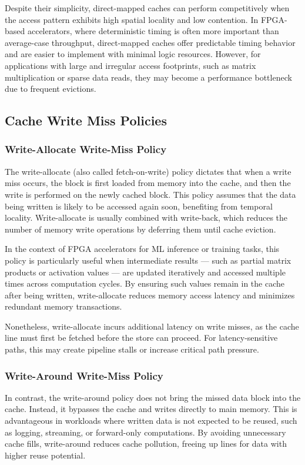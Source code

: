 Despite their simplicity, direct-mapped caches can perform competitively when the access pattern exhibits high spatial locality and low contention. In FPGA-based accelerators, where deterministic timing is often more important than average-case throughput, direct-mapped caches offer predictable timing behavior and are easier to implement with minimal logic resources. However, for applications with large and irregular access footprints, such as matrix multiplication or sparse data reads, they may become a performance bottleneck due to frequent evictions.

\subsection{Cache Write Miss Policies}
\subsubsection{Write-Allocate Write-Miss Policy}
The write-allocate (also called fetch-on-write) policy dictates that when a write miss occurs, the block is first loaded from memory into the cache, and then the write is performed on the newly cached block. This policy assumes that the data being written is likely to be accessed again soon, benefiting from temporal locality. Write-allocate is usually combined with write-back, which reduces the number of memory write operations by deferring them until cache eviction.

In the context of FPGA accelerators for ML inference or training tasks, this policy is particularly useful when intermediate results — such as partial matrix products or activation values — are updated iteratively and accessed multiple times across computation cycles. By ensuring such values remain in the cache after being written, write-allocate reduces memory access latency and minimizes redundant memory transactions\cite{cache-3}.

Nonetheless, write-allocate incurs additional latency on write misses, as the cache line must first be fetched before the store can proceed. For latency-sensitive paths, this may create pipeline stalls or increase critical path pressure.

\subsubsection{Write-Around Write-Miss Policy}
In contrast, the write-around policy does not bring the missed data block into the cache. Instead, it bypasses the cache and writes directly to main memory. This is advantageous in workloads where written data is not expected to be reused, such as logging, streaming, or forward-only computations. By avoiding unnecessary cache fills, write-around reduces cache pollution, freeing up lines for data with higher reuse potential.

